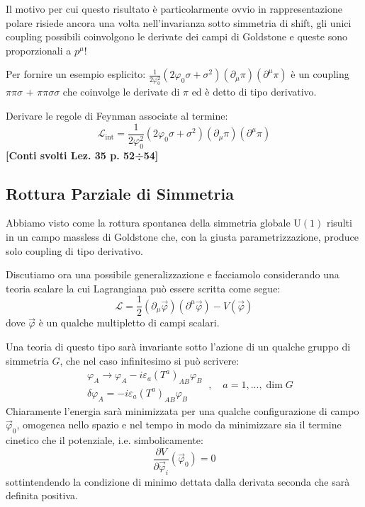\documentclass[../main.tex]{subfiles}
\begin{document}
Il motivo per cui questo risultato è particolarmente ovvio in rappresentazione polare risiede ancora una volta nell'invarianza sotto simmetria di shift, gli unici coupling possibili coinvolgono le derivate dei campi di Goldstone e queste sono proporzionali a $p^\mu$!

Per fornire un esempio esplicito: $\frac{1}{2\varphi_0^2}(2\varphi_0\sigma + \sigma^2)(\partial_\mu\pi)(\partial^\mu\pi)$ è un coupling $\pi\pi\sigma$ + $\pi\pi\sigma\sigma$ che coinvolge le derivate di $\pi$ ed è detto di tipo derivativo.
\begin{exercise}
    Derivare le regole di Feynman associate al termine:
    \[
    \mathscr{L}_\text{int} = \frac{1}{2\varphi_0^2}(2\varphi_0\sigma + \sigma^2)(\partial_\mu\pi)(\partial^\mu\pi) 
    \]
    \textbf{[Conti svolti Lez. 35 p. 52÷54]}
\end{exercise}

\subsection{Rottura Parziale di Simmetria}
Abbiamo visto come la rottura spontanea della simmetria globale $\textrm{U}(1)$ risulti in un campo massless di Goldstone che, con la giusta parametrizzazione, produce solo coupling di tipo derivativo. 

Discutiamo ora una possibile generalizzazione e facciamolo considerando una teoria scalare la cui Lagrangiana può essere scritta come segue:
\begin{equation}
    \mathscr{L} = \frac{1}{2}(\partial_\mu\Vec{\varphi}) (\partial^\mu\Vec{\varphi}) - V(\Vec{\varphi})
    \label{eq:generalized_scalar_lagrangian}
\end{equation}
dove $\Vec{\varphi}$ è un qualche multipletto di campi scalari.

Una teoria di questo tipo sarà invariante sotto l'azione di un qualche gruppo di simmetria $G$, che nel caso infinitesimo si può scrivere:
\begin{equation}
    \begin{aligned}
        &\varphi_A\rightarrow\varphi_A - i\varepsilon_a(T^a)_{AB}\varphi_B \\
        &\delta\varphi_A = - i\varepsilon_a(T^a)_{AB}\varphi_B
    \end{aligned}
    ~,\quad a=1,...,\dim G
    \label{eq:generalized_group_action_infinitesimal}
\end{equation}
Chiaramente l'energia sarà minimizzata per una qualche configurazione di campo $\Vec{\varphi}_0$, omogenea nello spazio e nel tempo in modo da minimizzare sia il termine cinetico che il potenziale, i.e. simbolicamente:
\[
\frac{\partial V}{\partial\Vec{\varphi}_i}(\Vec{\varphi}_0) = 0
\]
sottintendendo la condizione di minimo dettata dalla derivata seconda che sarà definita positiva.
\end{document}
